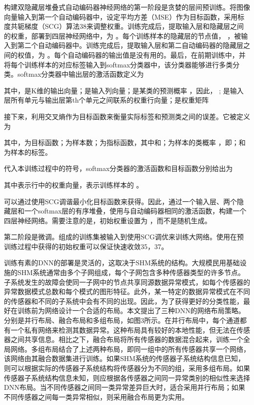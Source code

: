 构建双隐藏层堆叠式自动编码器神经网络的第一阶段是贪婪的层间预训练。将图像向量输入到第一个自动编码器中，设定平均方差（MSE）作为目标函数，采用标度共轭梯度（SCG）算法38来调整权重。训练完成后，提取输入层和隐藏层之间的权重，部署到四层神经网络中，为 。每个训练样本的隐藏层的节点值， ，被输入到第二个自动编码器中。训练完成后，提取输入层和第二自动编码器的隐藏层之间的权值，为 。每个自动编码器的输出值是没有用的。最后，在前期训练中，并将每个训练样本的对应标签输入到softmax分类器中，该分类器能够进行多类分类。softmax分类器中输出层的激活函数定义为

其中，是K维的输出向量；是输入列向量；是某类的预测概率 ，因此， ; 是输入层所有单元与输出层第th个单元之间联系的权重行向量；是权重矩阵


接下来，利用交叉熵作为目标函数来衡量实际标签和预测类之间的误差。它被定义为


其中，为目标函数；为样本数；为指标函数，其中和；为样本的类概率 ，即；和为样本的标签。


代入本训练过程中的符号，softmax分类器的激活函数和目标函数分别给出为

其中表示行中的权重向量，表示训练样本的 。

可以通过使用SCG调谐最小化目标函数来获得。因此，通过一个输入层、两个隐藏层和一个softmax层的有序堆叠，使用与自动编码器相同的激活函数，构建一个四层神经网络。需要注意的是，初始权重设置为 ，而不是随机生成。

第二阶段是微调。组成的训练集被输入到使用SCG调优来训练大网络。使用在预训练过程中获得的初始权重可以保证快速收敛35，37。

训练有素的DNN的部署是灵活的，这取决于SHM系统的结构。大规模民用基础设施的SHM系统通常由多个子网组成，每个子网包含多种传感器类型的许多节点。子系统发生的故障会使同一子网中的节点共享同源数据异常模式，如每个传感器的异常数据模式总数和每个模式的图形特征。此外，某一特定的数据异常模式在不同的传感器和不同的子系统中会有不同的出现。因此，为了获得更好的分类性能，最好在训练前为网络设计一个合适的布局。本文提出了三种DNN的网络布局策略。分别是并行布局、融合布局和多组布局，如图3所示。在并行布局中，每个通道都有一个私有网络来检测其数据异常。这种布局具有较好的本地性能，但无法在传感器之间共享信息。相比之下，融合布局将所有传感器的数据混合起来，训练一个全局网络。多组布局结合了上述两种布局，即同一组中的所有传感器共享一个网络，该网络由其融合数据集进行训练。如果SHM系统的传感器子系统结构信息已知，则可以根据实际的传感器子系统结构将传感器分为不同的组，采用多组布局。如果传感器子系统结构信息未知，则应根据各传感器之间同一异常类别的相似性来选择DNN布局。当不同传感器之间同一类异常差异巨大时，适合采用并行布局；如果不同传感器之间每一类异常相似，则采用融合布局更为实用。

